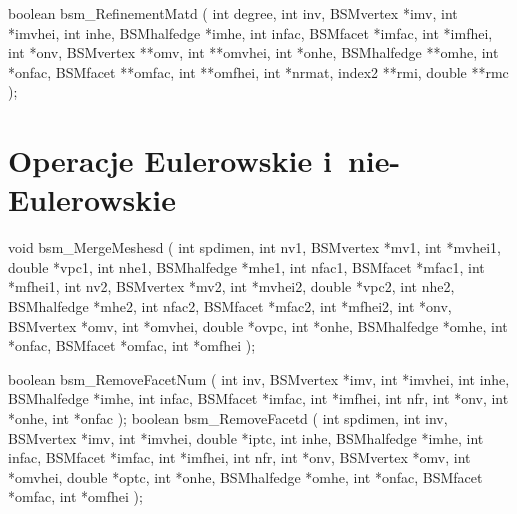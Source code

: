 \begin{listingC}
boolean bsm_RefinementMatd ( int degree,
                             int inv, BSMvertex *imv, int *imvhei,
                             int inhe, BSMhalfedge *imhe,
                             int infac, BSMfacet *imfac, int *imfhei,
                             int *onv, BSMvertex **omv, int **omvhei,
                             int *onhe, BSMhalfedge **omhe,
                             int *onfac, BSMfacet **omfac, int **omfhei,
                             int *nrmat, index2 **rmi, double **rmc );  
\end{listingC}


\newpage
\section{Operacje Eulerowskie i~nie-Eulerowskie}

\begin{listingC}
void bsm_MergeMeshesd ( int spdimen,
                  int nv1, BSMvertex *mv1, int *mvhei1, double *vpc1,
                  int nhe1, BSMhalfedge *mhe1,
                  int nfac1, BSMfacet *mfac1, int *mfhei1,
                  int nv2, BSMvertex *mv2, int *mvhei2, double *vpc2,
                  int nhe2, BSMhalfedge *mhe2,
                  int nfac2, BSMfacet *mfac2, int *mfhei2,
                  int *onv, BSMvertex *omv, int *omvhei, double *ovpc,
                  int *onhe, BSMhalfedge *omhe,
                  int *onfac, BSMfacet *omfac, int *omfhei );
\end{listingC}

\begin{listingC}
boolean bsm_RemoveFacetNum ( int inv, BSMvertex *imv, int *imvhei,
                             int inhe, BSMhalfedge *imhe,
                             int infac, BSMfacet *imfac, int *imfhei,
                             int nfr,
                             int *onv, int *onhe, int *onfac );
boolean bsm_RemoveFacetd ( int spdimen,
                   int inv, BSMvertex *imv, int *imvhei, double *iptc,
                   int inhe, BSMhalfedge *imhe,
                   int infac, BSMfacet *imfac, int *imfhei,
                   int nfr,
                   int *onv, BSMvertex *omv, int *omvhei, double *optc,
                   int *onhe, BSMhalfedge *omhe,
                   int *onfac, BSMfacet *omfac, int *omfhei );
\end{listingC}

